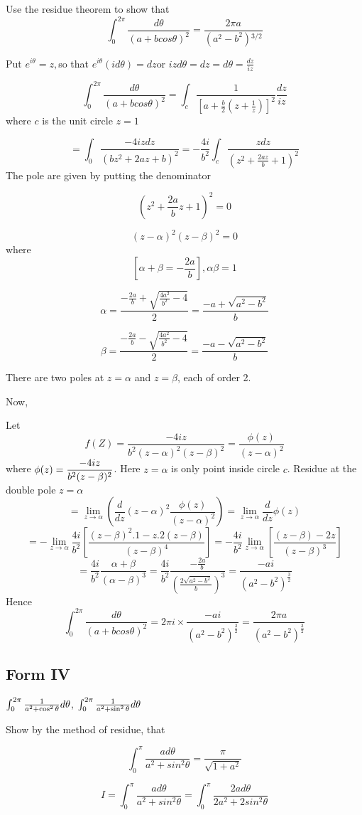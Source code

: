 \begin{example}
Use the residue theorem to show that \[
\int_{0}^{2\pi}\frac{d\theta}{(a+bcos\theta)^{2}}=\frac{2\pi a}{\left(a^{2}-b^{2}\right){}^{3/2}}\]
\end{example}
\begin{solution}
Put $e^{i\theta}=z,$so that $e^{i\theta}(id\theta)=dz$or $izd\theta=dz=d\theta=\frac{dz}{iz}$

\[
\int_{0}^{2\pi }\frac{d\theta}{(a+bcos\theta)^{2}}=\int_{c}\frac{1}{[a+\frac{b}{2}(z+\frac{1}{z})]^{2}}\frac{dz}{iz}\]
where $c$ is the unit circle $z=1$

\[
=\int_{0}\frac{-4izdz}{(bz^{2}+2az+b)^{2}}=-\frac{4i}{b^{2}}\int_{c}\frac{zdz}{(z^{2}+\frac{2az}{b}+1)^{2}}\]
The pole are given by putting the denominator

\[
(z^{2}+\frac{2a}{b}z+1)^{2}=0\]


\[
(z-\alpha)^{2}(z-\beta)^{2}=0\]
where\[
[\alpha+\beta=-\frac{2a}{b}],\alpha\beta=1\]


\[
\alpha=\frac{-\frac{2a}{b}+\sqrt{\frac{4a^{2}}{b^{2}}-4}}{2}=\frac{-a+\sqrt{a^{2}-b^{2}}}{b}\]


\[
\beta=\frac{-\frac{2a}{b}-\sqrt{\frac{4a^{2}}{b^{2}}-4}}{2}=\frac{-a-\sqrt{a^{2}-b^{2}}}{b}\]


There are two poles at $z=\alpha$ and $z=\beta$, each of order 2.

Now,

Let\[
f(Z)=\frac{-4iz}{b^{2}(z-\alpha)^{2}(z-\beta)^{2}}=\frac{\phi(z)}{(z-\alpha)^{2}}\]
where $\displaystyle \phi(z)=\frac{-4iz}{b^{2}(z-\beta)^{2}}$. Here $z=\alpha$ is
only point inside circle $c$. Residue at the double pole $z=\alpha$ 
\[=\lim_{z\rightarrow\alpha}\left(\frac{d}{dz}(z-\alpha)^{2}\frac{\phi(z)}{(z-\alpha)^{2}}\right)=\lim_{z\rightarrow\alpha}\frac{d}{dz}\phi(z)\]
\[=-\lim_{z\rightarrow\alpha}\frac{4i}{b^{2}}\left[\frac{(z-\beta)^{2}.1-z.2(z-\beta)}{(z-\beta)^{4}}\right]=-\frac{4i}{b^{2}}\lim_{z\rightarrow\alpha}\left[\frac{(z-\beta)-2z}{(z-\beta)^{3}}\right]\]
\[=\frac{4i}{b^{2}}\frac{\alpha+\beta}{(\alpha-\beta)^{3}}=\frac{4i}{b^{2}}\frac{-\frac{2a}{b}}{\left(\frac{2\sqrt{a^{2}-b^{2}}}{b}\right)^{3}}=\frac{-ai}{(a^{2}-b^{2})^{\frac{3}{2}}}\]
Hence \[\int_{0}^{2\pi}\frac{d\theta}{(a+bcos\theta)^{2}}=2\pi i\times\frac{-ai}{(a^{2}-b^{2})^{\frac{3}{2}}}=\frac{2\pi a}{(a^{2}-b^{2})^{\frac{3}{2}}}\]
\end{solution}
\subsection{Form IV}
$\int_0^{2\pi} {1 \over a^2 + \cos ^2 \theta} d\theta$, $\int_0^{2\pi} {1 \over a^2 + \sin^2 \theta}d\theta$
\begin{example}
Show by the method of residue, that

\[
\int_{0}^{\pi}\frac{ad\theta}{a^{2}+sin^{2}\theta}=\frac{\pi}{\sqrt{1+a^{2}}}\]

\end{example}
\[
I=\int_{0}^{\pi}\frac{ad\theta}{a^{2}+sin^{2}\theta}=\int_{0}^{\pi}\frac{2ad\theta}{2a^{2}+2sin^{2}\theta}\]


